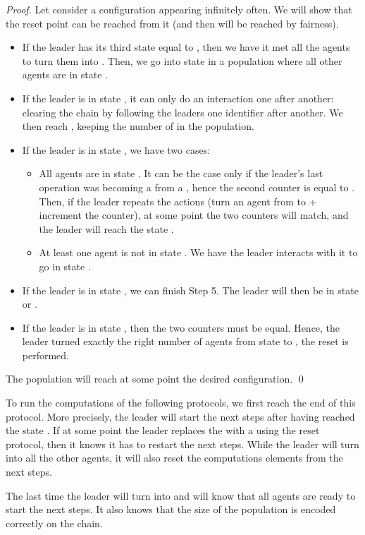 \documentclass[UKenglish]{llncs}
\begin{document}
\begin{proof}
Let consider a configuration appearing infinitely often.
We will show that the reset point can be reached from it
(and then will be reached by fairness).
\begin{itemize}
\item If the leader has its third state equal to , then we have it met all the agents to turn them
into . Then, we go into state  in a
population where all other agents are in state .
\item If the leader is in state , it can only do an interaction one
after another: clearing the chain by following the leaders one identifier
after another.
We then
reach , keeping the number of  in the population.
\item If the leader is in state ,
we have two cases:
\begin{itemize}
\item All agents are in state . It can be the case only if the leader's last
operation was becoming a  from a ,
hence the second counter is equal to . Then, if the leader repeats
the actions (turn an agent from  to  + increment the counter),
at some point the two counters will match, and the leader will reach the state .
\item At least one agent is not in state . We have the leader interacts with
it to go in state .
\end{itemize}
\item If the leader is in state , we can finish Step 5. The
leader will then be in state  or .
\item If the leader is in state , then the two counters must be equal.
Hence, the leader turned exactly the right number of agents from state  to ,
the reset is performed.
\end{itemize}
The population will reach at some point the desired configuration. \hfill \qed
 \end{proof}

To run the computations of the following protocols, we first reach the end
of this protocol. More precisely, the leader will start the next steps after
having reached the state . If at some point the leader replaces
the  with a  using the reset protocol, then it knows it has to restart
the next steps. While the leader will turn into  all the other agents,
it will also reset the computations elements from the next steps.

The last time the leader will turn into  and  will know that all
agents are ready to start the next steps. It also knows that the size of the population
is encoded correctly on the chain.
\end{document}
